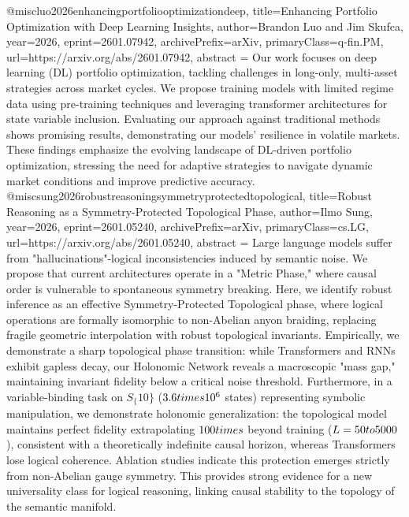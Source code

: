 {}@misc{luo2026enhancingportfoliooptimizationdeep,
      title={Enhancing Portfolio Optimization with Deep Learning Insights}, 
      author={Brandon Luo and Jim Skufca},
      year={2026},
      eprint={2601.07942},
      archivePrefix={arXiv},
      primaryClass={q-fin.PM},
      url={https://arxiv.org/abs/2601.07942},
      abstract = {Our work focuses on deep learning (DL) portfolio optimization, tackling challenges in long-only, multi-asset strategies across market cycles. We propose training models with limited regime data using pre-training techniques and leveraging transformer architectures for state variable inclusion. Evaluating our approach against traditional methods shows promising results, demonstrating our models' resilience in volatile markets. These findings emphasize the evolving landscape of DL-driven portfolio optimization, stressing the need for adaptive strategies to navigate dynamic market conditions and improve predictive accuracy.}
}@misc{sung2026robustreasoningsymmetryprotectedtopological,
      title={Robust Reasoning as a Symmetry-Protected Topological Phase}, 
      author={Ilmo Sung},
      year={2026},
      eprint={2601.05240},
      archivePrefix={arXiv},
      primaryClass={cs.LG},
      url={https://arxiv.org/abs/2601.05240},
      abstract = {Large language models suffer from "hallucinations"-logical inconsistencies induced by semantic noise. We propose that current architectures operate in a "Metric Phase," where causal order is vulnerable to spontaneous symmetry breaking. Here, we identify robust inference as an effective Symmetry-Protected Topological phase, where logical operations are formally isomorphic to non-Abelian anyon braiding, replacing fragile geometric interpolation with robust topological invariants. Empirically, we demonstrate a sharp topological phase transition: while Transformers and RNNs exhibit gapless decay, our Holonomic Network reveals a macroscopic "mass gap," maintaining invariant fidelity below a critical noise threshold. Furthermore, in a variable-binding task on $S_\{10\}$ ($3.6 \\times 10^6$ states) representing symbolic manipulation, we demonstrate holonomic generalization: the topological model maintains perfect fidelity extrapolating $100\\times$ beyond training ($L=50 \\to 5000$), consistent with a theoretically indefinite causal horizon, whereas Transformers lose logical coherence. Ablation studies indicate this protection emerges strictly from non-Abelian gauge symmetry. This provides strong evidence for a new universality class for logical reasoning, linking causal stability to the topology of the semantic manifold.}
}
